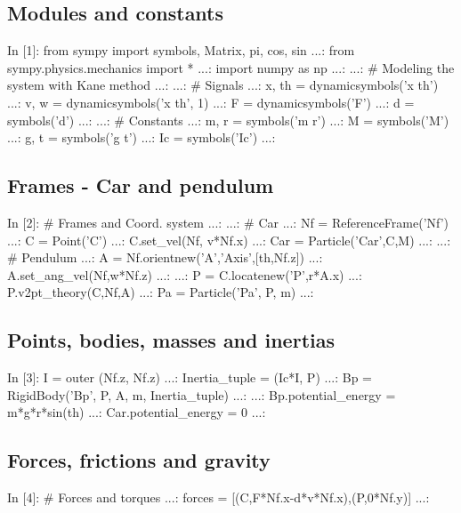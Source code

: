 \subsection{Modules and constants}
\begin{code}
In [1]: from sympy import symbols, Matrix, pi, cos, sin
   ...: from sympy.physics.mechanics import *
   ...: import numpy as np
   ...: 
   ...: # Modeling the system with Kane method
   ...: 
   ...: # Signals
   ...: x, th  = dynamicsymbols('x th')
   ...: v, w = dynamicsymbols('x th', 1)
   ...: F = dynamicsymbols('F')
   ...: d = symbols('d')
   ...: 
   ...: # Constants
   ...: m, r = symbols('m r')
   ...: M = symbols('M')
   ...: g, t = symbols('g t')
   ...: Ic = symbols('Ic')
   ...: 
\end{code}

\subsection{Frames - Car and pendulum}
\begin{code}
In [2]: # Frames and Coord. system
   ...: 
   ...: # Car
   ...: Nf = ReferenceFrame('Nf')
   ...: C = Point('C')                         
   ...: C.set_vel(Nf, v*Nf.x)
   ...: Car = Particle('Car',C,M)
   ...: 
   ...: # Pendulum
   ...: A = Nf.orientnew('A','Axis',[th,Nf.z])
   ...: A.set_ang_vel(Nf,w*Nf.z)
   ...: 
   ...: P = C.locatenew('P',r*A.x)
   ...: P.v2pt_theory(C,Nf,A)
   ...: Pa = Particle('Pa', P, m)
   ...: 
\end{code}

\subsection{Points, bodies, masses and inertias}
\begin{code}
In [3]: I = outer (Nf.z, Nf.z)
   ...: Inertia_tuple = (Ic*I, P)
   ...: Bp = RigidBody('Bp', P, A, m, Inertia_tuple)
   ...: 
   ...: Bp.potential_energy = m*g*r*sin(th)
   ...: Car.potential_energy = 0
   ...: 
\end{code}

\subsection{Forces, frictions and gravity}
\begin{code}
In [4]: # Forces and torques
   ...: forces = [(C,F*Nf.x-d*v*Nf.x),(P,0*Nf.y)]
   ...: 
\end{code}

